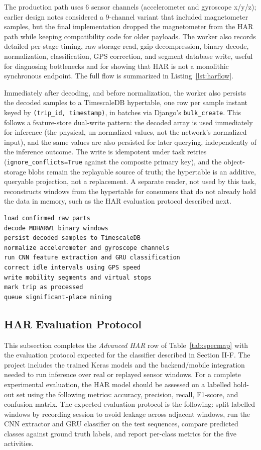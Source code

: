 \documentclass[conference,a4paper]{IEEEtran}
\begin{document}
The production path uses 6 sensor channels (accelerometer and gyroscope x/y/z); earlier design notes considered a 9-channel variant that included magnetometer samples, but the final implementation dropped the magnetometer from the HAR path while keeping compatibility code for older payloads. The worker also records detailed per-stage timing, raw storage read, gzip decompression, binary decode, normalization, classification, GPS correction, and segment database write, useful for diagnosing bottlenecks and for showing that HAR is not a monolithic synchronous endpoint. The full flow is summarized in Listing~\ref{lst:harflow}.

Immediately after decoding, and before normalization, the worker also persists the decoded samples to a TimescaleDB hypertable, one row per sample instant keyed by \texttt{(trip\_id, timestamp)}, in batches via Django's \texttt{bulk\_create}. This follows a feature-store dual-write pattern: the decoded array is used immediately for inference (the physical, un-normalized values, not the network's normalized input), and the same values are also persisted for later querying, independently of the inference outcome. The write is idempotent under task retries (\texttt{ignore\_conflicts=True} against the composite primary key), and the object-storage blobs remain the replayable source of truth; the hypertable is an additive, queryable projection, not a replacement. A separate reader, not used by this task, reconstructs windows from the hypertable for consumers that do not already hold the data in memory, such as the HAR evaluation protocol described next.

\begin{lstlisting}[language={},caption={Final HAR processing flow.},label={lst:harflow}]
load confirmed raw parts
decode MDHARW1 binary windows
persist decoded samples to TimescaleDB
normalize accelerometer and gyroscope channels
run CNN feature extraction and GRU classification
correct idle intervals using GPS speed
write mobility segments and virtual stops
mark trip as processed
queue significant-place mining
\end{lstlisting}

\subsection{HAR Evaluation Protocol}

This subsection completes the \textit{Advanced HAR} row of Table~\ref{tab:specmap} with the evaluation protocol expected for the classifier described in Section II-F. The project includes the trained Keras models and the backend/mobile integration needed to run inference over real or replayed sensor windows. For a complete experimental evaluation, the HAR model should be assessed on a labelled hold-out set using the following metrics: accuracy, precision, recall, F1-score, and confusion matrix. The expected evaluation protocol is the following: split labelled windows by recording session to avoid leakage across adjacent windows, run the CNN extractor and GRU classifier on the test sequences, compare predicted classes against ground truth labels, and report per-class metrics for the five activities.
\end{document}
